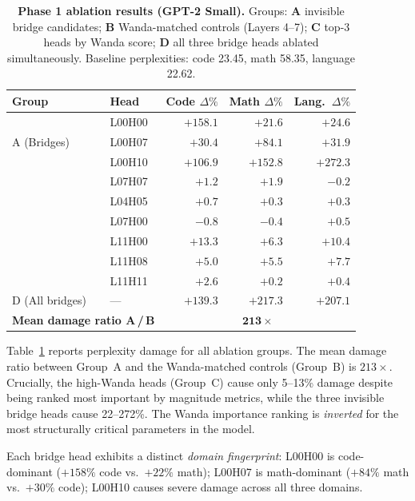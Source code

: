 \documentclass[11pt,a4paper]{article}
\theoremstyle{definition}
\theoremstyle{plain}
\begin{document}
\begin{table}[t]
\centering
\caption{%
    \textbf{Phase 1 ablation results (GPT-2 Small).}
    Groups:
    \textbf{A} invisible bridge candidates;
    \textbf{B} Wanda-matched controls (Layers 4--7);
    \textbf{C} top-3 heads by Wanda score;
    \textbf{D} all three bridge heads ablated simultaneously.
    Baseline perplexities: code 23.45, math 58.35, language 22.62.
\label{tab:phase1}}
\small
\setlength{\tabcolsep}{5pt}
\begin{tabular}{llrrr}
\toprule
\textbf{Group} & \textbf{Head} &
\textbf{Code $\Delta\%$} & \textbf{Math $\Delta\%$} & \textbf{Lang.\ $\Delta\%$} \\
\midrule
\multirow{3}{*}{A (Bridges)}
  & L00H00 & $+158.1$ & $+21.6$  & $+24.6$ \\
  & L00H07 & $+30.4$  & $+84.1$  & $+31.9$ \\
  & L00H10 & $+106.9$ & $+152.8$ & $+272.3$ \\
\addlinespace
\multirow{3}{*}{B (Wanda ctrl.)}
  & L07H07 & $+1.2$  & $+1.9$  & $-0.2$ \\
  & L04H05 & $+0.7$  & $+0.3$  & $+0.3$ \\
  & L07H00 & $-0.8$  & $-0.4$  & $+0.5$ \\
\addlinespace
\multirow{3}{*}{C (High-Wanda)}
  & L11H00 & $+13.3$ & $+6.3$  & $+10.4$ \\
  & L11H08 & $+5.0$  & $+5.5$  & $+7.7$  \\
  & L11H11 & $+2.6$  & $+0.2$  & $+0.4$  \\
\addlinespace
D (All bridges) & ---
  & $+139.3$ & $+217.3$ & $+207.1$ \\
\midrule
\multicolumn{2}{l}{\textbf{Mean damage ratio A\,/\,B}}
  & \multicolumn{3}{c}{$\mathbf{213\times}$} \\
\bottomrule
\end{tabular}
\end{table}

Table~\ref{tab:phase1} reports perplexity damage for all ablation groups.
The mean damage ratio between Group~A and the Wanda-matched controls
(Group~B) is $213\times$.
Crucially, the high-Wanda heads (Group~C) cause only 5--13\% damage
despite being ranked most important by magnitude metrics, while the three
invisible bridge heads cause 22--272\%.
The Wanda importance ranking is \emph{inverted} for the most structurally
critical parameters in the model.

Each bridge head exhibits a distinct \emph{domain fingerprint}:
L00H00 is code-dominant ($+158\%$ code vs.\ $+22\%$ math);
L00H07 is math-dominant ($+84\%$ math vs.\ $+30\%$ code);
L00H10 causes severe damage across all three domains.
\end{document}
